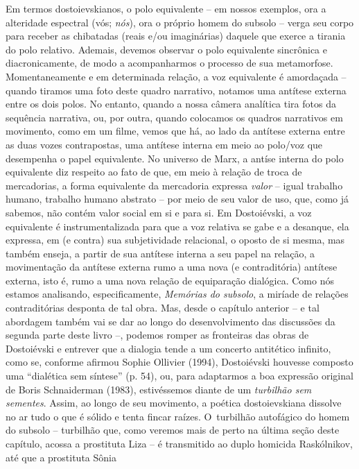 {Em termos dostoievskianos, o polo equivalente -- em nossos exemplos, ora
a alteridade espectral (vós; \emph{nós}), ora o próprio homem do subsolo
-- verga seu corpo para receber as chibatadas (reais e/ou imaginárias)
daquele que exerce a tirania do polo relativo. Ademais, devemos observar
o polo equivalente sincrônica e diacronicamente, de modo a acompanharmos
o processo de sua metamorfose. Momentaneamente e em determinada relação,
a voz equivalente é amordaçada -- quando tiramos uma foto deste quadro
narrativo, notamos uma antítese externa entre os dois polos. No entanto,
quando a nossa câmera analítica tira fotos da sequência narrativa, ou,
por outra, quando colocamos os quadros narrativos em movimento, como em
um filme, vemos que há, ao lado da antítese externa entre as duas vozes
contrapostas, uma antítese interna em meio ao polo/voz que desempenha o
papel equivalente. No universo de Marx, a antíse interna do polo
equivalente diz respeito ao fato de que, em meio à relação de troca de
mercadorias, a forma equivalente da mercadoria expressa \emph{valor} --
igual trabalho humano, trabalho humano abstrato -- por meio de seu valor
de uso, que, como já sabemos, não contém valor social em si e para si.
Em Dostoiévski, a voz equivalente é instrumentalizada para que a voz
relativa se gabe e a desanque, ela expressa, em (e contra) sua
subjetividade relacional, o oposto de si mesma, mas também enseja, a
partir de sua antítese interna a seu papel na relação, a movimentação da
antítese externa rumo a uma nova (e contraditória) antítese externa,
isto é, rumo a uma nova relação de equiparação dialógica. Como nós
estamos analisando, especificamente, \emph{Memórias do subsolo}, a
miríade de relações contraditórias desponta de tal obra. Mas, desde o
capítulo anterior -- e tal abordagem também vai se dar ao longo do
desenvolvimento das discussões da segunda parte deste livro --, podemos
romper as fronteiras das obras de Dostoiévski e entrever que a dialogia
tende a um concerto antitético infinito, como se, conforme afirmou
Sophie Ollivier (1994), Dostoiévski houvesse composto uma ``dialética
sem síntese'' (p. 54), ou, para adaptarmos a boa expressão original de
Boris Schnaiderman (1983), estivéssemos diante de um \emph{turbilhão sem
sementes}. Assim, ao longo de seu movimento, a poética dostoievskiana
dissolve no ar tudo o que é sólido e tenta fincar raízes. O~turbilhão
autofágico do homem do subsolo -- turbilhão que, como veremos mais de
perto na última seção deste capítulo, acossa a prostituta Liza -- é
transmitido ao duplo homicida Raskólnikov, até que a prostituta Sônia
}
